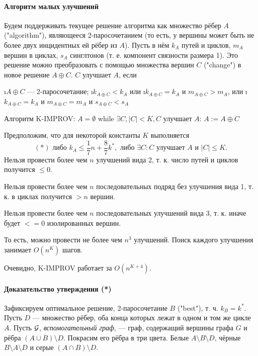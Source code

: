 \paragraph{Алгоритм малых улучшений}
Будем поддерживать текущее решение алгоритма как множество рёбер $A$ ("algorithm"), являющееся 2-паросочетанием (то есть, у вершины может быть не более двух инцидентных ей рёбер из $A$). Пусть в нём $k_A$ путей и циклов, $m_A$ вершин в циклах, $s_A$ синглтонов (т. е. компонент связности размера 1). Это решение можно преобразовать с помощью множества вершин $C$ ("change") в новое решение $A \oplus C$. $C$ улучшает $A$, если 
\begin{enumerate}
	\i $A \oplus C$ --- 2-паросочетание;
	\i $k_{A \oplus C} < k_A$ или
	\i $k_{A \oplus C} = k_A$ и $m_{A \oplus C} > m_A$, или
	\i $k_{A \oplus C} = k_A$ и $m_{A \oplus C} = m_A$ и $s_{A \oplus C} < s_A$
\end{enumerate}

Алгоритм K-IMPROV:
$A = \emptyset$
while $\exists C, |C|<K, C$ улучшает $A$:
$A := A \oplus C$

Предположим, что для некоторой константы $K$ выполняется 
$$(*) \text{ либо } k_A \le \frac{1}{7}n+\frac{8}{7}k^*, \text{ либо } \exists C: C \text{ улучшает } A \textbf{ и } |C|\le K.$$
Нельзя провести более чем $n$ улучшений вида 2, т. к. число путей и циклов получится $\le0$.

Нельзя провести более чем $n$ последовательных подряд без улучшения вида 1, т. к. в циклах получится $>n$ вершин.

Нельзя провести более чем $n$ последовательных улучшений вида 3, т. к. иначе будет $<= 0$ изолированных вершин. 

То есть, можно провести не более чем $n^3$ улучшений. Поиск каждого улучшения занимает $O(n^K)$ шагов.

Очевидно, K-IMPROV работает за $O(n^{K+4})$. 

\paragraph{Доказательство утверждения (*)}
Зафиксируем оптимальное решение, 2-паросочетание $B$ ("best"), т. ч. $k_B = k^*$. Пусть $D$ --- множество рёбер, оба конца которых лежат в одном и том же цикле $A$. Пусть $\mathcal{G}$, \textit{вспомогательный граф}, --- граф, содержащий вершины графа $G$ и рёбра $(A \cup B) \setminus D$. Покрасим его рёбра в три цвета.
Белые $A \setminus B \setminus D$, чёрные $B \setminus A \setminus D$ и серые $(A \cap B) \setminus D$. 

